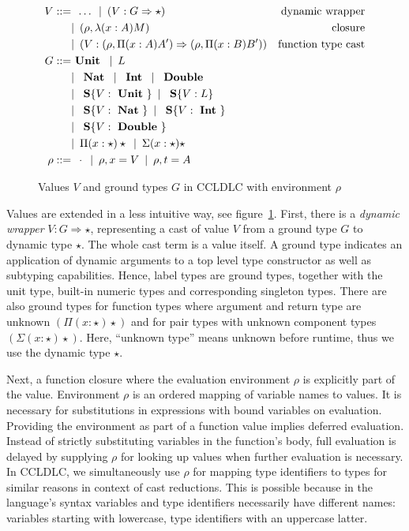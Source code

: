 \begin{figure}
\begin{align*}
 V ::= & \enspace \dots \enspace
        |\enspace (V : G \Rightarrow \star) & \text{dynamic wrapper}\\
      & |\enspace (\rho, \lambda(x:A)M) & \text{closure} \\
      & |\enspace (V : (\rho, \Pi(x:A) A') \Rightarrow (\rho, \Pi(x:B) B') ) & \text{function type cast} \\
 G ::= & \text{ \textbf{Unit} } \enspace|\enspace
    L \\
    & |\enspace \text{ \textbf{Nat} } \enspace|\enspace \text{ \textbf{Int} } \enspace|\enspace \text{ \textbf{Double} } \\
    & |\enspace \text{ \textbf{S}}\{V: \text{ \textbf{Unit} }\} \enspace|\enspace \text{ \textbf{S}}\{V: L\} \\
    & |\enspace \text{ \textbf{S}}\{V: \text{ \textbf{Nat} }\} \enspace|\enspace \text{ \textbf{S}}\{V: \text{ \textbf{Int} }\} \\ 
    & |\enspace \text{ \textbf{S}}\{V: \text{ \textbf{Double} }\} \\
    & |\enspace
    \Pi(x:\star)\star \enspace|\enspace
    \Sigma(x:\star)\star \\
 \rho ::= & \enspace \cdot \enspace|\enspace \rho, x = V  \enspace|\enspace \rho,t = A
\end{align*}
\caption[Values $V$ and ground types $G$ in CCLDLC]{Values $V$ and ground types $G$ in CCLDLC with environment $\rho$}
\label{fig:ccldlc-extensions-values}
\end{figure}

Values are extended in a less intuitive way, see figure~\ref{fig:ccldlc-extensions-values}. First, there is a \emph{dynamic wrapper} $V : G \Rightarrow \star$, representing a cast of value $V$ from a ground type $G$ to dynamic type $\star$. The whole cast term is a value itself. A ground type indicates an application of dynamic arguments to a top level type constructor as well as subtyping capabilities. Hence, label types are ground types, together with the unit type, built-in numeric types and corresponding singleton types. There are also ground types for function types where argument and return type are unknown $(\Pi(x:\star)\star)$ and for pair types with unknown component types $(\Sigma(x:\star)\star)$. Here, ``unknown type'' means unknown before runtime, thus we use the dynamic type $\star$.

Next, a function closure where the evaluation environment $\rho$ is explicitly part of the value. Environment $\rho$ is an ordered mapping of variable names to values. It is necessary for substitutions in expressions with bound variables on evaluation. Providing the environment as part of a function value implies deferred evaluation. Instead of strictly substituting variables in the function's body, full evaluation is delayed by supplying $\rho$ for looking up values when further evaluation is necessary. In CCLDLC, we simultaneously use $\rho$ for mapping type identifiers to types for similar reasons in context of cast reductions. This is possible because in the language's syntax variables and type identifiers necessarily have different names: variables starting with lowercase, type identifiers with an uppercase latter.


